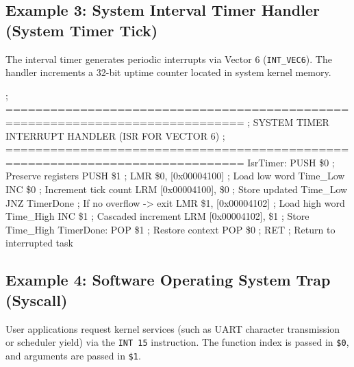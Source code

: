 \documentclass[11pt,a4paper]{article}
\newcommand{\reg}{\$}
\begin{document}
\subsection{Example 3: System Interval Timer Handler (System Timer Tick)}

The interval timer generates periodic interrupts via Vector 6 (\texttt{INT\_VEC6}). The handler increments a 32-bit uptime counter located in system kernel memory.

\begin{examplebox}[title={Listing: Interval Timer Interrupt Handler (timer.asm)},top=2.5pt,bottom=2.5pt,unbreakable]
\begin{limasm}
; ==============================================================================
; SYSTEM TIMER INTERRUPT HANDLER (ISR FOR VECTOR 6)
; ==============================================================================
IsrTimer:
    PUSH        \reg0                       ; Preserve registers
    PUSH        \reg1                       ;
    LMR         \reg0, [0x00004100]         ; Load low word Time_Low
    INC         \reg0                       ; Increment tick count
    LRM         [0x00004100], \reg0         ; Store updated Time_Low
    JNZ         TimerDone                   ; If no overflow -> exit
    LMR         \reg1, [0x00004102]         ; Load high word Time_High
    INC         \reg1                       ; Cascaded increment
    LRM         [0x00004102], \reg1         ; Store Time_High
TimerDone:
    POP         \reg1                       ; Restore context
    POP         \reg0                       ;
    RET                                     ; Return to interrupted task
\end{limasm}
\end{examplebox}

\clearpage

\subsection{Example 4: Software Operating System Trap (Syscall)}

User applications request kernel services (such as UART character transmission or scheduler yield) via the \texttt{INT 15} instruction. The function index is passed in \texttt{\reg0}, and arguments are passed in \texttt{\reg1}.
\end{document}
